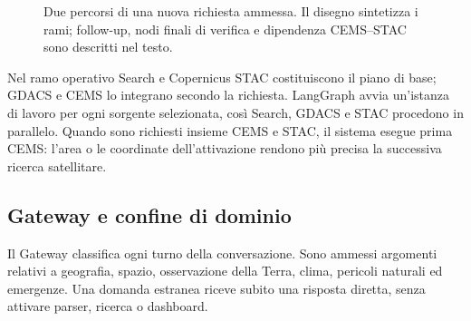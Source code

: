 \begin{figure}[htbp]
\centering
{}
\caption{Due percorsi di una nuova richiesta ammessa. Il disegno sintetizza i
rami; follow-up, nodi finali di verifica e dipendenza CEMS--STAC sono descritti
nel testo.}
\label{fig:workflow-principale}
\end{figure}

Nel ramo operativo Search e Copernicus STAC costituiscono il piano di base;
GDACS e CEMS lo integrano secondo la richiesta. LangGraph avvia un'istanza di
lavoro per ogni sorgente selezionata, così Search, GDACS e STAC procedono in
parallelo. Quando sono richiesti insieme CEMS e STAC, il sistema esegue prima
CEMS: l'area o le coordinate dell'attivazione rendono più precisa la
successiva ricerca satellitare.

\subsection{Gateway e confine di dominio}

Il Gateway classifica ogni turno della conversazione. Sono ammessi argomenti
relativi a geografia, spazio, osservazione della Terra, clima, pericoli
naturali ed emergenze. Una domanda estranea riceve subito una risposta diretta,
senza attivare parser, ricerca o dashboard.

